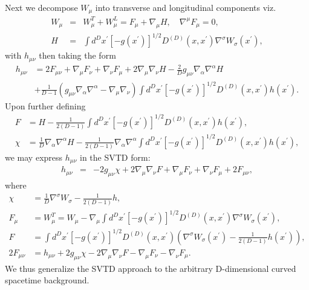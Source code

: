 Next we decompose $W_{\mu}$ into transverse and longitudinal components viz.
%
\begin{eqnarray}
W_{\mu} &=&W^T_{\mu}+W^L_{\mu}=F_{\mu}+\nabla_{\mu}H,\quad  \nabla^{\mu}F_{\mu}=0,
\nonumber\\
 H&=&\int d^Dx^{\prime}[-g(x^{\prime})]^{1/2}D^{(D)}(x,x^{\prime})\nabla^\sigma W_\sigma(x^{\prime}),
\label{A.45a}
\end{eqnarray}
%
with $h_{\mu\nu}$ then taking the form
%
\begin{align}
h_{\mu\nu}&= 2F_{\mu\nu} + \nabla_\mu F_\nu + \nabla_\nu F_\mu + 2 \nabla_\mu\nabla_\nu H - \frac{2}{D}g_{\mu\nu}\nabla_\alpha \nabla^\alpha H 
\nonumber\\
&+\frac{1}{D-1}\left( g_{\mu\nu}\nabla_\alpha \nabla^\alpha - \nabla_\mu\nabla_\nu\right)\int d^Dx^{\prime}[-g(x^{\prime})]^{1/2} D^{(D)}(x,x^{\prime}) h(x^{\prime}).
\label{A.46a}
\end{align}
%
Upon further defining
%
\begin{align}
F &= H - \frac{1}{2(D-1)} \int d^Dx^{\prime}[-g(x^{\prime})]^{1/2} D^{(D)}(x,x^{\prime}) h(x^{\prime}),
\nonumber\\
\chi &= \frac{1}{D}\nabla_\alpha\nabla^\alpha H - \frac{1}{2(D-1)}\nabla_\alpha\nabla^\alpha\int d^Dx^{\prime}[-g(x^{\prime})]^{1/2} D^{(D)}(x,x^{\prime}) h(x^{\prime}),
\label{A.47a}
\end{align}
%
we may express $h_{\mu\nu}$ in the SVTD form:
%
\begin{eqnarray}
h_{\mu\nu} &=& -2g_{\mu\nu}\chi + 2\nabla_\mu\nabla_\nu F + \nabla_\mu F_\nu + \nabla_\nu F_\mu + 2F_{\mu\nu}
\label{A.48a},
\end{eqnarray}
%
where
%
\begin{align}
\chi &= \frac{1}{D}\nabla^\sigma W_{\sigma}  - \frac{1}{2(D-1)}h,
\nonumber\\
F_{\mu} &= W_{\mu}^T=W_{\mu} -\nabla_\mu \int d^Dx^{\prime}[-g(x^{\prime})]^{1/2} D^{(D)}(x,x^{\prime})\nabla^{\sigma}W_\sigma(x^{\prime}),
\nonumber\\
F &= \int d^Dx^{\prime}[-g(x^{\prime})]^{1/2} D^{(D)}(x,x^{\prime}) \left(\nabla^\sigma W_{\sigma}(x^{\prime})  - \frac{1}{2(D-1)}h(x^{\prime})\right),
\nonumber\\
2F_{\mu\nu} &= h_{\mu\nu}+2g_{\mu\nu}\chi - 2\nabla_\mu\nabla_\nu F - \nabla_\mu F_\nu - \nabla_\nu F_{\mu}.
\label{A.49a}
\end{align}
%
We thus generalize the SVTD approach to the arbitrary D-dimensional curved spacetime background.


